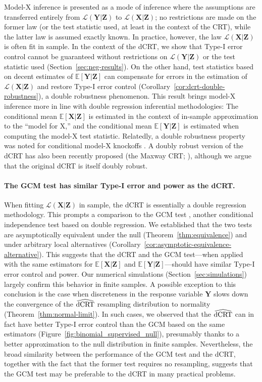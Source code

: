 \documentclass[12pt]{article}
\theoremstyle{definition}
\theoremstyle{remark}
\newcommand{\E}{\mathbb E}								%
\newcommand{\prx}{\bm X}								%
\newcommand{\prz}{\bm Z}								%
\newcommand{\pry}{{\bm Y}}								%
\newcommand{\law}{\mathcal L}							%
\newcommand{\dCRThat}{\widehat{\textnormal{dCRT}}}		%
\begin{document}
Model-X inference \citep{CetL16} is presented as a mode of inference where the assumptions are transferred entirely from $\law(\pry|\prz)$ to $\law(\prx|\prz)$; no restrictions are made on the former law (or the test statistic used, at least in the context of the CRT), while the latter law is assumed exactly known. In practice, however, the law $\law(\prx|\prz)$ is often fit in sample. In the context of the dCRT, we show that Type-I error control cannot be guaranteed without restrictions on $\law(\pry|\prz)$ or the test statistic used (Section~\ref{sec:neg-results}). On the other hand, test statistics based on decent estimates of $\E[\pry|\prz]$ can compensate for errors in the estimation of $\law(\prx|\prz)$ and restore Type-I error control (Corollary~\ref{cor:dcrt-double-robustness}), a double robustness phenomenon. This result brings model-X inference more in line with double regression inferential methodologies: The conditional mean $\E[\prx|\prz]$ is estimated in the context of in-sample approximation to the ``model for X,'' and the conditional mean $\E[\pry|\prz]$ is estimated when computing the model-X test statistic. Relatedly, a double robustness property was noted for conditional model-X knockoffs \citep{Huang2019}. A doubly robust version of the dCRT has also been recently proposed (the Maxway CRT; \cite{Li2022}), although we argue that the original dCRT is itself doubly robust.

\paragraph{The GCM test has similar Type-I error and power as the dCRT.}

When fitting $\law(\prx|\prz)$ in sample, the dCRT is essentially a double regression methodology. This prompts a comparison to the GCM test \citep{Shah2018}, another conditional independence test based on double regression. We established that the two tests are asymptotically equivalent under the null (Theorem~\ref{thm:equivalence}) and under arbitrary local alternatives (Corollary~\ref{cor:asymptotic-equivalence-alternative}). This suggests that the dCRT and the GCM test---when applied with the same estimators for $\E[\prx|\prz]$ and $\E[\pry|\prz]$---should have similar Type-I error control and power. Our numerical simulations (Section~\ref{sec:simulations}) largely confirm this behavior in finite samples. A possible exception to this conclusion is the case when discreteness in the response variable $\pry$ slows down the convergence of the $\dCRThat$ resampling distribution to normality (Theorem~\ref{thm:normal-limit}). In such cases, we observed that the $\dCRThat$ can in fact have better Type-I error control than the GCM based on the same estimators (Figure~\ref{fig:binomial_supervised_null}), presumably thanks to a better approximation to the null distribution in finite samples. Nevertheless, the broad similarity between the performance of the GCM test and the dCRT, together with the fact that the former test requires no resampling, suggests that the GCM test may be preferable to the dCRT in many practical problems.
\end{document}
